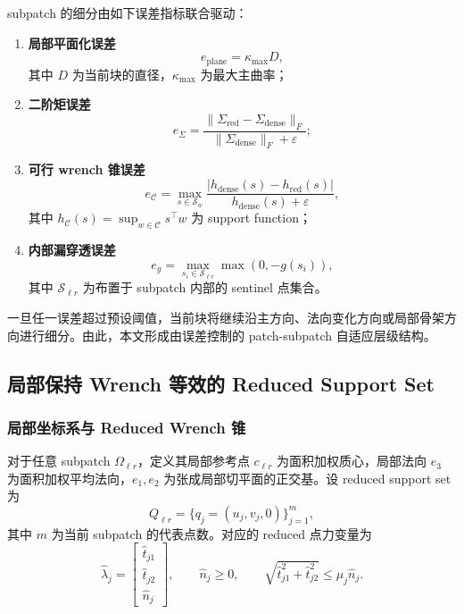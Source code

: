 subpatch 的细分由如下误差指标联合驱动：
\begin{enumerate}[label=(\roman*)]
    \item \textbf{局部平面化误差}
    \begin{equation}
    e_{\mathrm{plane}} = \kappa_{\max} D,
    \end{equation}
    其中 $D$ 为当前块的直径，$\kappa_{\max}$ 为最大主曲率；

    \item \textbf{二阶矩误差}
    \begin{equation}
    e_{\Sigma}
    =
    \frac{\|\Sigma_{\mathrm{red}}-\Sigma_{\mathrm{dense}}\|_F}
    {\|\Sigma_{\mathrm{dense}}\|_F+\varepsilon};
    \end{equation}

    \item \textbf{可行 wrench 锥误差}
    \begin{equation}
    e_{\mathcal{C}}
    =
    \max_{s\in\mathcal{S}_w}
    \frac{|h_{\mathrm{dense}}(s)-h_{\mathrm{red}}(s)|}
    {h_{\mathrm{dense}}(s)+\varepsilon},
    \end{equation}
    其中 $h_{\mathcal{C}}(s)=\sup_{w\in\mathcal{C}} s^\top w$ 为 support function；

    \item \textbf{内部漏穿透误差}
    \begin{equation}
    e_g = \max_{s_i\in \mathcal{S}_{\ell r}} \max(0,-g(s_i)),
    \end{equation}
    其中 $\mathcal{S}_{\ell r}$ 为布置于 subpatch 内部的 sentinel 点集合。
\end{enumerate}

一旦任一误差超过预设阈值，当前块将继续沿主方向、法向变化方向或局部骨架方向进行细分。由此，本文形成由误差控制的 patch-subpatch 自适应层级结构。

\subsection{局部保持 Wrench 等效的 Reduced Support Set}

\subsubsection{局部坐标系与 Reduced Wrench 锥}

对于任意 subpatch $\Omega_{\ell r}$，定义其局部参考点 $c_{\ell r}$ 为面积加权质心，局部法向 $e_3$ 为面积加权平均法向，$e_1,e_2$ 为张成局部切平面的正交基。设 reduced support set 为
\begin{equation}
Q_{\ell r}=\{q_j=(u_j,v_j,0)\}_{j=1}^{m},
\end{equation}
其中 $m$ 为当前 subpatch 的代表点数。对应的 reduced 点力变量为
\begin{equation}
\hat{\lambda}_j=
\begin{bmatrix}
\hat{t}_{j1}\\
\hat{t}_{j2}\\
\hat{n}_j
\end{bmatrix},
\qquad
\hat{n}_j\ge0,
\qquad
\sqrt{\hat{t}_{j1}^2+\hat{t}_{j2}^2}\le \mu_j \hat{n}_j.
\end{equation}

